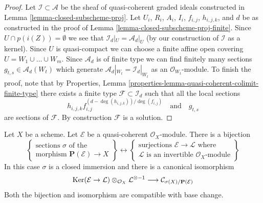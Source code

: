 \begin{proof}
Let $\mathcal{I} \subset \mathcal{A}$ be the sheaf of quasi-coherent
graded ideals constructed in Lemma \ref{lemma-closed-subscheme-proj}.
Let $U_i$, $R_i$, $A_i$, $I_i$, $f_{i, j}$, $h_{i, j, k}$, and $d$
be as constructed in the proof of
Lemma \ref{lemma-closed-subscheme-proj-finite}.
Since $U \cap p(i(Z)) = \emptyset$ we see that
$\mathcal{I}_d|_U = \mathcal{A}_d|_U$ (by our construction of
$\mathcal{I}$ as a kernel). Since $U$ is quasi-compact we
can choose a finite affine open covering $U = W_1 \cup \ldots \cup W_m$.
Since $\mathcal{A}_d$ is of finite type we can find finitely many sections
$g_{t, s} \in \mathcal{A}_d(W_t)$ which generate
$\mathcal{A}_d|_{W_t} = \mathcal{I}_d|_{W_t}$
as an $\mathcal{O}_{W_t}$-module. To finish the proof, note that by
Properties, Lemma \ref{properties-lemma-quasi-coherent-colimit-finite-type}
there exists a finite type $\mathcal{F} \subset \mathcal{I}_d$
such that all the local sections
$$
h_{i, j, k}f_{i, j}^{(d - \deg(h_{i, j, k}))/\deg(f_{i, j})}
\quad\text{and}\quad
g_{t, s}
$$
are sections of $\mathcal{F}$. By construction $\mathcal{F}$ is a solution.
\end{proof}

\begin{lemma}
\label{lemma-conormal-sheaf-section-projective-bundle}
Let $X$ be a scheme. Let $\mathcal{E}$ be a quasi-coherent
$\mathcal{O}_X$-module. There is a bijection
$$
\left\{
\begin{matrix}
\text{sections }\sigma\text{ of the } \\
\text{morphism } \mathbf{P}(\mathcal{E}) \to X
\end{matrix}
\right\}
\leftrightarrow
\left\{
\begin{matrix}
\text{surjections }\mathcal{E} \to \mathcal{L}\text{ where} \\
\mathcal{L}\text{ is an invertible }\mathcal{O}_X\text{-module}
\end{matrix}
\right\}
$$
In this case $\sigma$ is a closed immersion and there is a canonical
isomorphism
$$
\mathop{\mathrm{Ker}}(\mathcal{E} \to \mathcal{L})
\otimes_{\mathcal{O}_X} \mathcal{L}^{\otimes -1}
\longrightarrow
\mathcal{C}_{\sigma(X)/\mathbf{P}(\mathcal{E})}
$$
Both the bijection and isomorphism are compatible with base change.
\end{lemma}

